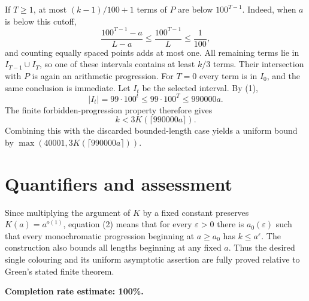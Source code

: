 \documentclass[11pt]{article}
\begin{document}
If $T\ge1$, at most $(k-1)/100+1$ terms of $P$ are below $100^{T-1}$. Indeed, when $a$ is below this cutoff,
\[
 \frac{100^{T-1}-a}{L-a}\le\frac{100^{T-1}}L\le\frac1{100},
\]
and counting equally spaced points adds at most one. All remaining terms lie in $I_{T-1}\cup I_T$, so one of these intervals contains at least $k/3$ terms. Their intersection with $P$ is again an arithmetic progression. For $T=0$ every term is in $I_0$, and the same conclusion is immediate. Let $I_t$ be the selected interval. By (1),
\[
 |I_t|=99\cdot100^t\le99\cdot100^T\le990000a.
\]
The finite forbidden-progression property therefore gives
\[
 k<3K(\lceil990000a\rceil). \tag{2}
\]
Combining this with the discarded bounded-length case yields a uniform bound by $\max(40001,3K(\lceil990000a\rceil))$.

\section*{Quantifiers and assessment}
Since multiplying the argument of $K$ by a fixed constant preserves $K(a)=a^{o(1)}$, equation (2) means that for every $\varepsilon>0$ there is $a_0(\varepsilon)$ such that every monochromatic progression beginning at $a\ge a_0$ has $k\le a^\varepsilon$. The construction also bounds all lengths beginning at any fixed $a$. Thus the desired single colouring and its uniform asymptotic assertion are fully proved relative to Green's stated finite theorem.

\textbf{Completion rate estimate: 100\%.}
\end{document}

